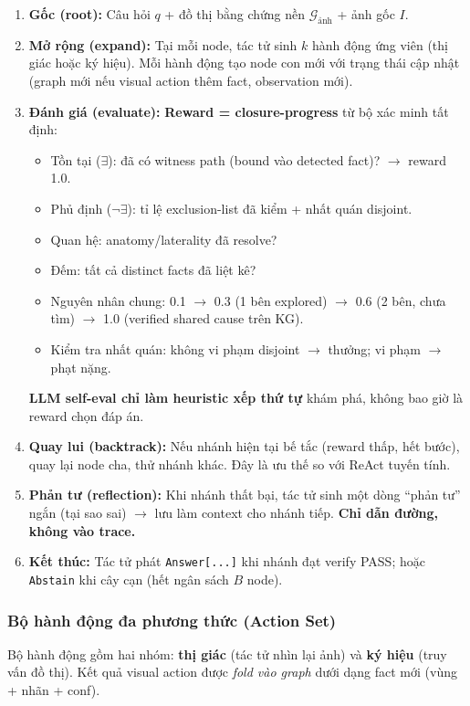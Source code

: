 \documentclass[11pt,a4paper]{article}
\begin{document}
\begin{enumerate}[leftmargin=1.5em]
  \item \textbf{Gốc (root):} Câu hỏi $q$ + đồ thị bằng chứng nền $\mathcal{G}_\text{ảnh}$ + ảnh gốc $I$.
  \item \textbf{Mở rộng (expand):} Tại mỗi node, tác tử sinh $k$ hành động ứng viên (thị giác hoặc ký hiệu). Mỗi hành động tạo node con mới với trạng thái cập nhật (graph mới nếu visual action thêm fact, observation mới).
  \item \textbf{Đánh giá (evaluate):} \textbf{Reward = closure-progress} từ bộ xác minh tất định:
    \begin{itemize}
      \item Tồn tại ($\exists$): đã có witness path (bound vào detected fact)? $\to$ reward 1.0.
      \item Phủ định ($\neg\exists$): tỉ lệ exclusion-list đã kiểm + nhất quán disjoint.
      \item Quan hệ: anatomy/laterality đã resolve?
      \item Đếm: tất cả distinct facts đã liệt kê?
      \item Nguyên nhân chung: 0.1 $\to$ 0.3 (1 bên explored) $\to$ 0.6 (2 bên, chưa tìm) $\to$ 1.0 (verified shared cause trên KG).
      \item Kiểm tra nhất quán: không vi phạm disjoint $\to$ thưởng; vi phạm $\to$ phạt nặng.
    \end{itemize}
    \textbf{LLM self-eval chỉ làm heuristic xếp thứ tự} khám phá, không bao giờ là reward chọn đáp án.
  \item \textbf{Quay lui (backtrack):} Nếu nhánh hiện tại bế tắc (reward thấp, hết bước), quay lại node cha, thử nhánh khác. Đây là ưu thế so với ReAct tuyến tính.
  \item \textbf{Phản tư (reflection):} Khi nhánh thất bại, tác tử sinh một dòng ``phản tư'' ngắn (tại sao sai) $\to$ lưu làm context cho nhánh tiếp. \textbf{Chỉ dẫn đường, không vào trace.}
  \item \textbf{Kết thúc:} Tác tử phát \texttt{Answer[...]} khi nhánh đạt verify PASS; hoặc \texttt{Abstain} khi cây cạn (hết ngân sách $B$ node).
\end{enumerate}

\subsubsection{Bộ hành động đa phương thức (Action Set)}

Bộ hành động gồm hai nhóm: \textbf{thị giác} (tác tử nhìn lại ảnh) và \textbf{ký hiệu} (truy vấn đồ thị). Kết quả visual action được \emph{fold vào graph} dưới dạng fact mới (vùng + nhãn + conf).
\end{document}
